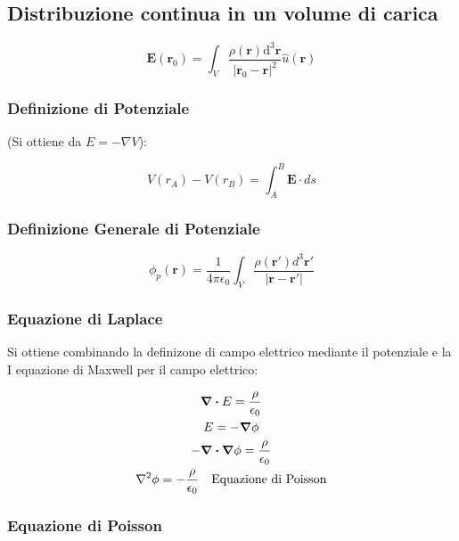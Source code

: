 \documentclass[a4paper]{scrarticle}
\begin{document}
\subsection*{Distribuzione continua in un volume di carica}

\begin{equation}
    \bm E(\bm r_0 ) = \int_{V} \frac{\rho(\bm r) \text{d}^3 \bm r}{|\bm r_0 - \bm r|^2} \hat{u}(\bm r)
\end{equation}

\subsubsection*{Definizione di Potenziale}
(Si ottiene da $E = -\nabla V$):

\begin{equation}
    V(r_A) - V(r_B) = \int_A^B \bm E \cdot ds
\end{equation}

\subsubsection*{Definizione Generale di Potenziale}

\begin{equation}
    \phi_p(\bm r) = \frac{1}{4\pi\epsilon_0}\int_{V}\frac{\rho(\bm r') d^3\bm r'}{\left|\bm r - \bm r'\right|}
\end{equation}


\subsubsection*{Equazione di Laplace}

Si ottiene combinando la definizone di campo elettrico mediante il potenziale e la I equazione di Maxwell per il campo elettrico:

\begin{gather*}
    \div E = \frac{\rho}{\epsilon_0}\\
    E = - \grad \phi\\
    - \div \grad \phi = \frac{\rho}{\epsilon_0}\\
    \laplacian \phi = -\frac{\rho}{\epsilon_0} \quad \text{Equazione di Poisson}
\end{gather*}

\subsubsection*{Equazione di Poisson}
\end{document}
